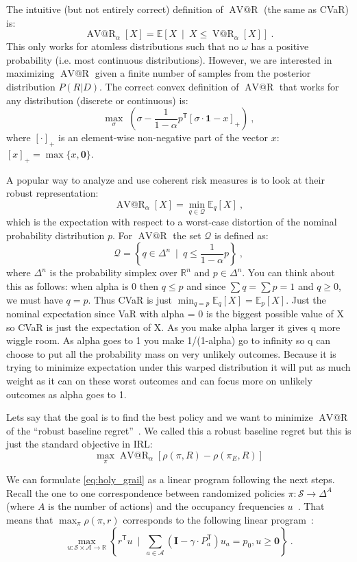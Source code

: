 \documentclass{article}
\makeatletter
\newcommand{\tr}{^\mathsf{T}}
\DeclareMathOperator{\var}{V@R}
\DeclareMathOperator{\avar}{AV@R}
\newcommand{\Ex}{\mathbb{E}}
\newcommand{\one}{\mathbf{1}}
\newcommand{\zero}{\mathbf{0}}
\newcommand{\eye}{\mathbf{I}}
\newcommand{\states}{\mathcal{S}}
\newcommand{\actions}{\mathcal{A}}
\newcommand{\Real}{\mathbb{R}}
\makeatother
\begin{document}
	The intuitive (but not entirely correct) definition of $\avar$ (the same as CVaR) is:
	\[ \avar_\alpha[X] = \Ex\left[ X ~\mid~ X \le \var_\alpha[X]\right] ~.\]
	This only works for atomless distributions such that no $\omega$ has a positive probability (i.e. most continuous distributions). However, we are interested in maximizing $\avar$ given a finite number of samples from the posterior distribution $P(R|D)$. The correct convex definition of $\avar$ that works for any distribution (discrete or continuous) is:
	\[ \max_{\sigma}\; \left( \sigma - \frac{1}{1-\alpha} p\tr [\sigma \cdot \one - x ]_+ \right) ~,\]
	where $[\cdot]_+$ is an element-wise non-negative part of the vector $x$: $[x]_+ = \max \{x, \zero\}$. 
	
	
	
	A popular way to analyze and use coherent risk measures is to look at their robust representation:
	\[ \avar_\alpha[X] = \min_{q\in\mathcal{Q}} \Ex_q[X]~, \]
	which is the expectation with respect to a worst-case distortion of the nominal probability distribution $p$. For $\avar$ the set $\mathcal{Q}$ is defined as:
	\[ \mathcal{Q} = \left\{ q \in \Delta^n ~\mid~ q \le \frac{1}{1-\alpha} p \right\} ~, \]
	where $\Delta^n$ is the probability simplex over $\mathbb{R}^n$ and $p \in \Delta^n$. You can think about this as follows: when alpha is 0 then $q\leq p$ and since $\sum q = \sum p = 1$ and $q \geq 0$, we must have $q = p$. Thus CVaR is just $\min_{q=p}\mathbb{E}_q[X] = \mathbb{E}_p[X]$. Just the nominal expectation since VaR with alpha = 0 is the biggest possible value of X so CVaR is just the expectation of X. As you make alpha larger it gives q more wiggle room. As alpha goes to 1 you make 1/(1-alpha) go to infinity so q can choose to put all the probability mass on very unlikely outcomes. Because it is trying to minimize expectation under this warped distribution it will put as much weight as it can on these worst outcomes and can focus more on unlikely outcomes as alpha goes to 1. 
	
	Lets say that the goal is to find the best policy and we want to minimize $\avar$ of the ``robust baseline regret''~\cite{Ho2016,Petrik2016,Syed2008}. We called this a robust baseline regret but this is just the standard objective in IRL:
	\begin{equation} \label{eq:holy_grail}
	\max_{\pi} \avar_\alpha\left[ \rho(\pi, R) - \rho(\pi_E, R) \right] 
	\end{equation}
	
	
	We can formulate \eqref{eq:holy_grail} as a linear program following the next steps. Recall the one to one correspondence between randomized policies $\pi: \mathcal{S} \to \Delta^A$ (where $A$ is the number of actions) and the occupancy frequencies $u$~\cite{Puterman2005}. That means that $\max_{\pi} \rho(\pi, r)$ corresponds to the following linear program~\cite{Puterman2005}:
	\[\max_{u:\states\times\actions\to\Real} \left\{ r\tr u ~\mid~ \sum_{a\in\mathcal{A}} (\eye - \gamma\cdot P_a\tr) u_a = p_0, u \ge \zero \right\}~. \]
	
\end{document}
